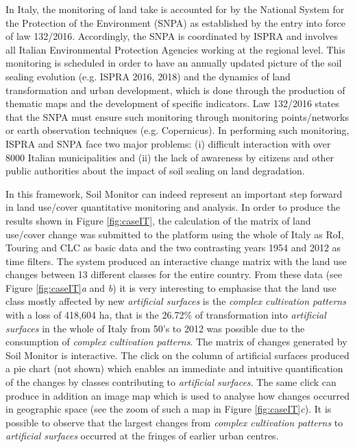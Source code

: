 \documentclass[APA,LATO1COL,doublespace]{WileyNJD-v2}
\begin{document}
In Italy, the monitoring of land take is accounted for by the National System for the Protection of the Environment (SNPA) as established by the entry into force of law 132/2016.
Accordingly, the SNPA is coordinated by ISPRA and involves all Italian Environmental Protection Agencies working at the regional level. 
This monitoring is scheduled in order to have an annually updated picture of the soil sealing evolution (e.g. ISPRA 2016, 2018) and the dynamics of land transformation and urban development, which is done through the production of thematic maps and the development of specific indicators. 
Law 132/2016 states that the SNPA must ensure such monitoring through monitoring points/networks or earth observation techniques (e.g. Copernicus).
In performing such monitoring, ISPRA and SNPA face two major problems: (i) difficult interaction with over 8000 Italian municipalities and (ii) the lack of awareness by citizens and other public authorities about the impact of soil sealing on land degradation.

In this framework, Soil Monitor can indeed represent an important step forward in land use/cover quantitative monitoring and analysis.
In order to produce the results shown in Figure \ref{fig:caseIT}, the calculation of the matrix of land use/cover change was submitted to the platform using the whole of Italy as RoI,
Touring and CLC as basic data and
the two contrasting years 1954 and 2012 as time filters.
The system produced an interactive change matrix with the land use changes between 13 different classes for the entire country.
From these data (see Figure \ref{fig:caseIT}\textit{a} and \textit{b}) it is very interesting to emphasise that the land use class mostly affected by new \textit{artificial surfaces} is the \textit{complex cultivation patterns} with a loss of 418,604 ha, that is the 26.72\% of transformation into \textit{artificial surfaces} in the whole of Italy from 50's to 2012 was possible due to the consumption of \textit{complex cultivation patterns}.
The matrix of changes generated by Soil Monitor is interactive. The click on the column of artificial surfaces produced a pie chart (not shown) which enables an immediate and intuitive quantification of the changes by classes contributing to \textit{artificial surfaces}. The same click can produce in addition an image map which is used to analyse how changes occurred in geographic space (see the zoom of such a map in Figure \ref{fig:caseIT}\textit{c}).
It is possible to observe that the largest changes from \textit{complex cultivation patterns} to \textit{artificial surfaces} occurred at the fringes of earlier urban centres.
\end{document}
